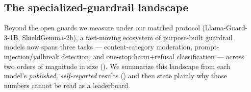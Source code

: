 
\subsection{The specialized-guardrail landscape}
\label{sec:guardrail-landscape}

Beyond the open guards we measure under our matched protocol (Llama-Guard-3-1B, ShieldGemma-2b), a fast-moving ecosystem of purpose-built guardrail models now spans three tasks --- content-category moderation, prompt-injection/jailbreak detection, and one-stop harm+refusal classification --- across two orders of magnitude in size (). We summarize this landscape from each model's \emph{published, self-reported} results () and then state plainly why those numbers cannot be read as a leaderboard.

